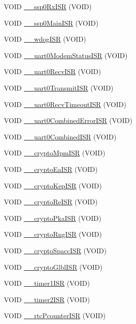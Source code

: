 \begin{DoxyCompactItemize}
VOID \hyperlink{a00531_a0bb876442efb455b01facbebea4a4756}{\_\-\_\-ssp0RxISR} (VOID)
\item 
VOID \hyperlink{a00531_ad3b350dc97e76414492421878acc2c7a}{\_\-\_\-ssp0MainISR} (VOID)
\item 
VOID \hyperlink{a00531_a3d2b26597de6548de913ff783d99da7e}{\_\-\_\-wdogISR} (VOID)
\item 
VOID \hyperlink{a00531_a93223e4e404f32f5521d58087008563e}{\_\-\_\-uart0ModemStatusISR} (VOID)
\item 
VOID \hyperlink{a00531_ad332e444a7fb6c696a36cd58e390a975}{\_\-\_\-uart0RecvISR} (VOID)
\item 
VOID \hyperlink{a00531_ae09fe03838c9b924e54ae1e503754ca6}{\_\-\_\-uart0TransmitISR} (VOID)
\item 
VOID \hyperlink{a00531_aed10a26f45d62e15e14b40ed2e3d6e50}{\_\-\_\-uart0RecvTimeoutISR} (VOID)
\item 
VOID \hyperlink{a00531_a3db6cec350a3eeca8c9adac159d736c2}{\_\-\_\-uart0CombinedErrorISR} (VOID)
\item 
VOID \hyperlink{a00531_a225dee555a7656debd29a70a46f139d8}{\_\-\_\-uart0CombinedISR} (VOID)
\item 
VOID \hyperlink{a00531_a023aa07e23659fbd1de0d32f5a758cb3}{\_\-\_\-cryptoMpmISR} (VOID)
\item 
VOID \hyperlink{a00531_a876f0ee89cae4454613b2d47784aa671}{\_\-\_\-cryptoEaISR} (VOID)
\item 
VOID \hyperlink{a00531_a20b26486cb26d45806cb74f6f64c150c}{\_\-\_\-cryptoKepISR} (VOID)
\item 
VOID \hyperlink{a00531_a2982c2f5cbb5ffb8aa306cb02a71ef14}{\_\-\_\-cryptoReISR} (VOID)
\item 
VOID \hyperlink{a00531_ad213e7ca5535d36603fd37c0480f6e5b}{\_\-\_\-cryptoPkaISR} (VOID)
\item 
VOID \hyperlink{a00531_a47c5cb3654235b9305ac5abfa7ed4b87}{\_\-\_\-cryptoRngISR} (VOID)
\item 
VOID \hyperlink{a00531_adb6d0d3e5c27da5cbf7bd8db52f7a6b7}{\_\-\_\-cryptoSpaccISR} (VOID)
\item 
VOID \hyperlink{a00531_a471a6c324a6d446829d42c6b07f41176}{\_\-\_\-cryptoGlblISR} (VOID)
\item 
VOID \hyperlink{a00531_a1fdb4bb45549b638b2a319d8c101ae48}{\_\-\_\-timer1ISR} (VOID)
\item 
VOID \hyperlink{a00531_af26653fd3c5daa2610483a5f9abede6f}{\_\-\_\-timer2ISR} (VOID)
\item 
VOID \hyperlink{a00531_ae15ac5e64e4dcf157da8254dddfab1d4}{\_\-\_\-rtcPcounterISR} (VOID)

\end{DoxyCompactItemize}
